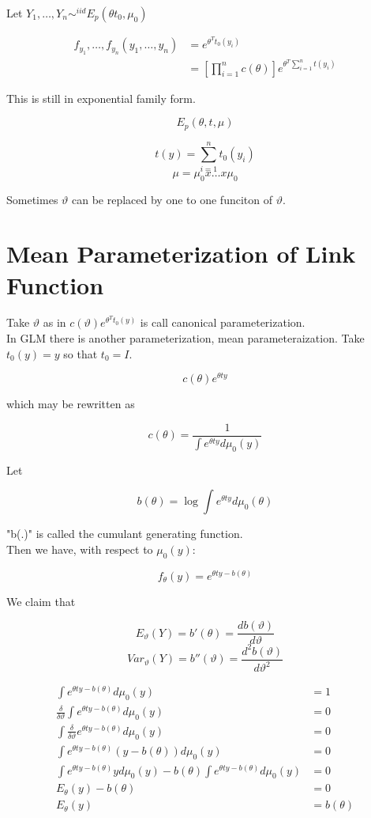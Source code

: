\documentclass[11pt,fleqn]{book} %
\begin{document}
Let $Y_1, \dots, Y_n \sim^{iid} E_p (\theta t_0, \mu_0)$

		\begin{align}
			f_{y_1}, \dots, f_{y_n} (y_1, \dots, y_n) &=   e^{\theta^T t_0(y_i)} \\
						&= \left[\prod^n_{i =1} c(\theta)\right]e^{\theta^T \sum^n_{i=1} t(y_i)}
		\end{align}


This is still in exponential family form. 

		$$E_p(\theta, t, \mu) $$

		$$t(y) =  \sum^n_{i=1} t_0(y_i)$$
		$$\mu = \mu_0 x \dots x\mu_0$$


Sometimes $\vartheta$ can be replaced by one to one funciton of $\vartheta$. 

\section{Mean Parameterization of Link Function}

Take $\vartheta$ as in $c(\vartheta) e^{\theta^T t_0(y)}$ is call canonical parameterization. \\

In GLM there is another parameterization, mean parameteraization. Take $t_0(y) = y$ so that $t_0 = I$. 

			$$c(\theta)e^{\theta ty}$$

which may be rewritten as

		$$c(\theta) = \frac{1}{\int e^{\theta ty} d\mu_0(y) }  $$


Let 

	$$b(\theta) = \log \int e^{\theta ty} d\mu_0(\theta) $$

"b(.)" is called the cumulant generating function.\\

Then we have, with respect to $\mu_0(y)$:

		$$f_\theta(y) = e^{\theta ty - b(\theta)} $$

We claim that 

		$$E_\vartheta(Y) = b'(\theta) = \frac{d b(\vartheta)}{d\vartheta} $$
		$$Var_\vartheta(Y) = b''(\vartheta) = \frac{d^2 b(\vartheta)}{d\vartheta^2}$$

		\begin{align*}
			\int  e^{\theta ty - b(\theta)} d\mu_0(y) &= 1\\
			\frac{\delta}{\delta\vartheta}\int  e^{\theta ty - b(\theta)} d\mu_0(y) &= 0\\
			\int \frac{\delta}{\delta\vartheta} e^{\theta ty - b(\theta)} d\mu_0(y) &= 0\\
			\int  e^{\theta ty - b(\theta)} (y - b(\theta)) d\mu_0(y) &= 0\\
			\int  e^{\theta ty - b(\theta)} y d\mu_0(y) - b(\theta) \int  e^{\theta ty - b(\theta)} d\mu_0(y) &=0\\
			E_\theta(y) - b(\theta) &= 0\\
			E_\theta(y) &= b(\theta)
		\end{align*}
\end{document}
